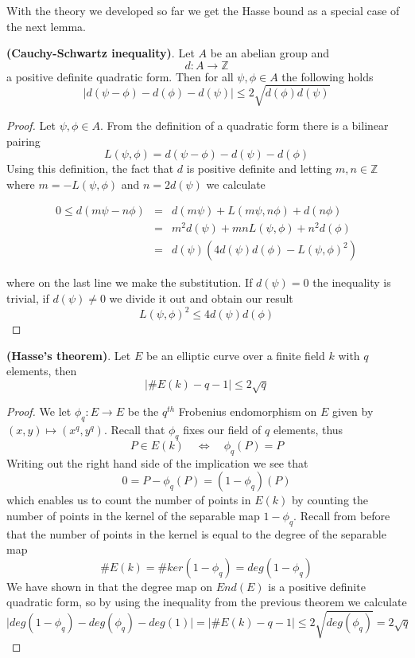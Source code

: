 With the theory we developed so far we get the Hasse bound as a special case of the next lemma.

\begin{lemma}
 \textbf{(Cauchy-Schwartz inequality)}. Let $A$ be an abelian group and
$$ d: A \rightarrow \mathbb{Z} $$
a positive definite quadratic form. Then for all $\psi, \phi \in A$ the following holds
$$ \lvert d(\psi-\phi)-d(\phi)-d(\psi) \rvert \leq 2 \sqrt{d(\phi)d(\psi)} $$
\end{lemma}
\begin{proof}
 Let $\psi, \phi \in A$. From the definition of a quadratic form there is a bilinear pairing
$$ L(\psi, \phi) = d(\psi-\phi) - d(\psi) - d(\phi) $$
Using this definition, the fact that $d$ is positive definite and letting $m,n \in \mathbb{Z}$ where
$m = -L(\psi, \phi)$ and $n = 2d(\psi)$ we calculate

\begin{eqnarray}
 0 \leq d(m\psi - n\phi) &=& d(m\psi) + L(m\psi, n\phi) + d(n\phi) \nonumber \\
			 &=& m^2 d(\psi) + mnL(\psi,\phi) + n^2 d(\phi) \nonumber \\
			 &=& d(\psi) \left( 4d(\psi)d(\phi)-L(\psi, \phi)^2 \right) \nonumber 
\end{eqnarray}

where on the last line we make the substitution. If $d(\psi)=0$ the inequality is trivial, if
$d(\psi) \neq 0$ we divide it out and obtain our result
$$L(\psi, \phi)^2 \leq 4d(\psi)d(\phi) $$
\end{proof}


\begin{thm}
 \textbf{(Hasse's theorem)}. Let $E$ be an elliptic curve over a finite field $k$ with $q$ elements, then
$$ \lvert \#E(k) - q - 1 \rvert \leq 2\sqrt{q} $$
\end{thm}
\begin{proof}
 We let $\phi_q: E \rightarrow E$ be the $q^{th}$ Frobenius endomorphism on $E$ given by 
$(x,y) \mapsto (x^q, y^q)$. Recall that $\phi_q$ fixes our field of $q$ elements, thus
$$ P \in E(k) \quad \iff \quad \phi_q(P) = P$$
Writing out the right hand side of the implication we see that
$$ 0 = P - \phi_q(P) = (1 - \phi_q)(P) $$
which enables us to count the number of points in $E(k)$ by counting the number of points in the kernel
of the separable map $1-\phi_q$. Recall from before that the number of points in the kernel is equal
to the degree of the separable map
$$ \#E(k) = \# ker(1-\phi_q) = deg(1-\phi_q) $$
We have shown in that the degree map on $End(E)$ is a positive definite quadratic form, so
by using the inequality from the previous theorem we calculate
$$\lvert deg(1-\phi_q) - deg(\phi_q) - deg(1)\rvert = \lvert \#E(k) - q - 1\rvert \leq 2\sqrt{deg(\phi_q)} = 2\sqrt{q}$$
\end{proof}

